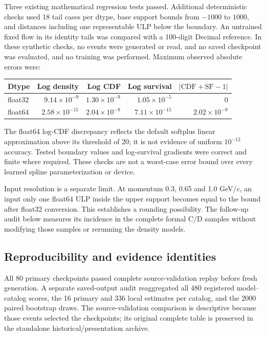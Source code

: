 \documentclass[11pt]{article}
\begin{document}
Three existing mathematical regression tests passed. Additional deterministic
checks used 18 tail cases per dtype, base support bounds from $-1000$ to
$1000$, and distances including one representable ULP below the boundary.
An untrained fixed flow in its identity tails was compared with a 100-digit
Decimal reference. In these synthetic checks, no events were generated or read, and no saved checkpoint was
evaluated, and no training was performed. Maximum observed absolute errors
were:
\begin{center}
\begin{tabular}{lrrrr}
\toprule
Dtype & Log density & Log CDF & Log survival & $|\mathrm{CDF}+\mathrm{SF}-1|$\\
\midrule
float32 & $9.14\times10^{-9}$ & $1.30\times10^{-9}$ & $1.05\times10^{-5}$ & $0$\\
float64 & $2.58\times10^{-15}$ & $2.04\times10^{-9}$ & $7.11\times10^{-15}$ & $2.02\times10^{-9}$\\
\bottomrule
\end{tabular}
\end{center}
The float64 log-CDF discrepancy reflects the default softplus linear
approximation above its threshold of 20; it is not evidence of uniform
$10^{-12}$ accuracy. Tested boundary values and log-survival gradients were
correct and finite where required. These checks are not a worst-case error
bound over every learned spline parameterization or device.

Input resolution is a separate limit. At momentum 0.3, 0.65 and 1.0 GeV/$c$,
an input only one float64 ULP inside the upper support becomes equal to the
bound after float32 conversion. This establishes a rounding possibility.
The follow-up audit below measures its incidence in the complete formal C/D
samples without modifying those samples or rerunning the density models.





\subsection{Reproducibility and evidence identities}
All 80 primary checkpoints passed complete source-validation replay before
fresh generation. A separate saved-output audit reaggregated all 480 registered
model--catalog scores, the 16 primary and 336 local estimates per catalog,
and the 2000 paired bootstrap draws. The source-validation comparison is
descriptive because those events selected the checkpoints; its original
complete table is preserved in the standalone historical/presentation archive.
\end{document}
